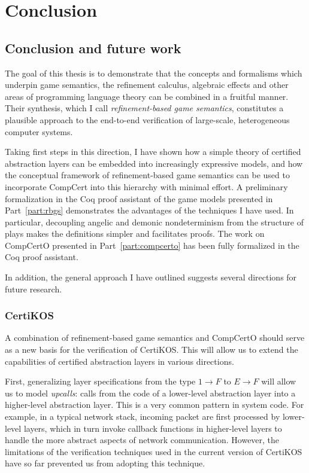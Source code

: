 \documentclass[11pt,oneside]{book}
\theoremstyle{definition}
\begin{document}



\part{Conclusion}

\chapter{Conclusion and future work} %

The goal of this thesis is to demonstrate that
the concepts and formalisms which underpin
game semantics,
the refinement calculus,
algebraic effects and
other areas of programming language theory
can be combined in a fruitful manner.
Their synthesis,
which I call \emph{refinement-based game semantics},
constitutes
a plausible approach to the end-to-end verification
of large-scale, heterogeneous computer systems.

Taking first steps in this direction,
I have shown how a simple theory of certified abstraction layers
can be embedded into increasingly expressive models,
and how the conceptual framework of refinement-based game semantics
can be used to incorporate CompCert into this hierarchy
with minimal effort.
A preliminary formalization in the Coq proof assistant
of the game models presented in Part~\ref{part:rbgs}
demonstrates the advantages of the techniques I have used.
In particular,
decoupling angelic and demonic nondeterminism
from the structure of plays
makes the definitions simpler and facilitates proofs.
The work on CompCertO presented in Part~\ref{part:compcerto}
has been fully formalized in the Coq proof assistant.

In addition,
the general approach I have outlined
suggests several directions for future research.

\section{CertiKOS} %

A combination of refinement-based game semantics
and CompCertO
should serve as a new basis
for the verification of CertiKOS.
This will allow us to extend the capabilities
of certified abstraction layers
in various directions.

First,
generalizing layer specifications
from the type $1 \rightarrow F$ to $E \rightarrow F$
will allow us to model \emph{upcalls}:
calls from the code of a lower-level abstraction layer
into a higher-level abstraction layer.
This is a very common pattern in system code.
For example,
in a typical network stack,
incoming packet are first processed by
lower-level layers,
which in turn invoke callback functions in
higher-level layers
to handle the more abstract aspects of
network communication.
However,
the limitations of the verification techniques
used in the current version of CertiKOS
have so far prevented us from adopting this technique.
\end{document}
